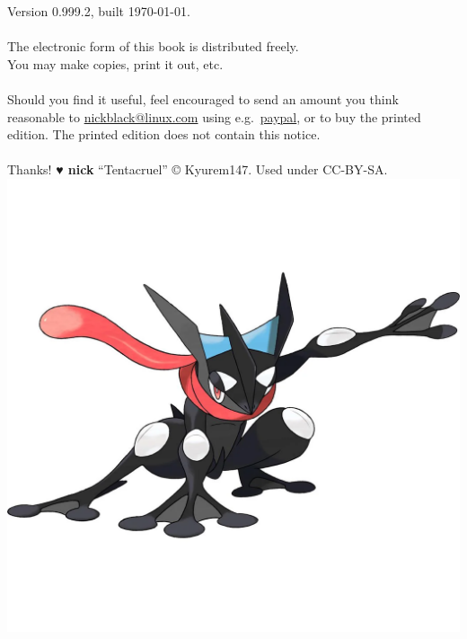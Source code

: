 \clearpage
\noindent{}Version 0.999.2, built \today.\\
\\
The electronic form of this book is distributed freely.\\
You may make copies, print it out, etc.\\
\\
Should you find it useful, feel encouraged to send an amount you think reasonable to
  \href{mailto:nickblack@linux.com}{nickblack@linux.com} using
  e.g.\ \href{https://paypal.me/dankamongmen}{paypal},
  or to buy the printed edition.
The printed edition does not contain this notice.\\
\\
Thanks! {\textbf{{\symbolfont♥} nick}}
\vfill
``Tentacruel'' © Kyurem147. Used under CC-BY-SA.
\vfill
\includegraphics[width=\linewidth,keepaspectratio]{images/greninja.png}
